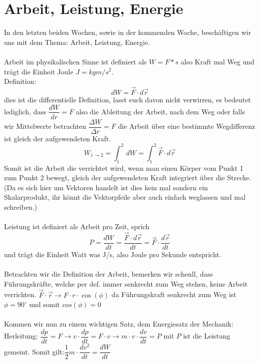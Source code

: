 \documentclass[12pt]{article}
\begin{document}
\section{Arbeit, Leistung, Energie}
In den letzten beiden Wochen, sowie in der kommenden Woche, beschäftigen wir uns mit dem Thema: Arbeit, Leistung, Energie.
\\
\\
Arbeit im physikalischen Sinne ist definiert als $W = F*s$ also Kraft mal Weg und trägt die Einheit Joule $J = kgm/s^2$.
\\
Definition:
\begin{equation}
dW = \vec{F} \cdot d\vec{r}
\end{equation}
dies ist die differentielle Definition, lasst euch davon nicht verwirren, es bedeutet lediglich, dass $\dfrac{dW}{dr} = F$ also die Ableitung der Arbeit, nach dem Weg oder falls wir Mittelwerte betrachten $\dfrac{\Delta W}{\Delta r} = F$ die Arbeit über eine bestimmte Wegdifferenz ist gleich der aufgewendeten Kraft.
\begin{equation}
W_{1\rightarrow 2} = \int_{1}^2 \,dW = \int_{1}^2 \vec{F} \cdot d\vec{r}
\end{equation}
Somit ist die Arbeit die verrichtet wird, wenn man einen Körper vom Punkt 1 zum Punkt 2 bewegt, gleich der aufgewendeten Kraft integriert über die Strecke. (Da es sich hier um Vektoren handelt ist dies kein mal sondern ein Skalarprodukt, ihr könnt die Vektorpfeile aber auch einfach weglassen und mal schreiben.)
\\
\\
Leistung ist definiert als Arbeit pro Zeit, sprich
\begin{equation}
P = \dfrac{dW}{dt} = \dfrac{\vec{F} \cdot d\vec{r}}{dt} = \vec{F} \cdot \dfrac{d\vec{r}}{dt}
\end{equation}
und trägt die Einheit Watt was J/s, also Joule pro Sekunde entspricht.
\\
\\
Betrachten wir die Definition der Arbeit, bemerken wir schenll, dass Führungskräfte, welche per def. immer senkrecht zum Weg stehen, keine Arbeit verrichten. $\vec{F} \cdot \vec{r} \rightarrow F \cdot r\cdot \cos(\phi)$ da Führungskraft senkrecht zum Weg ist $\phi = 90^\circ$ und somit $cos(\phi) = 0$
\\
\\
Kommen wir nun zu einem wichtigen Satz, dem Energiesatz der Mechanik:
\\ Herleitung:
$\dfrac{dp}{dt} = F \rightarrow v \cdot \dfrac{dp}{dt} = F \cdot v \rightarrow m\cdot v \cdot \dfrac{dv}{dt} = P$ mit $P$ ist die Leistung gemeint. Somit gilt:$\dfrac{1}{2}m\cdot\dfrac{dv^2}{dt} = \dfrac{dW}{dt}$
\end{document}
